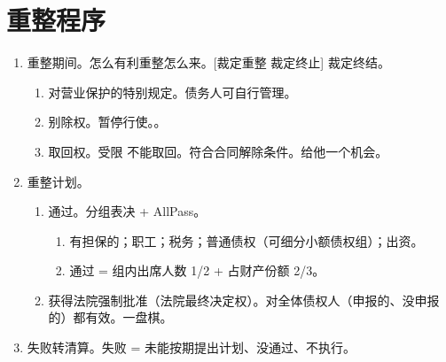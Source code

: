 \section{重整程序}
\begin{enumerate}
  \item 重整期间。怎么有利重整怎么来。[裁定重整 \yjt 裁定终止] \yjt 裁定终结。
        \begin{enumerate}
          \item 对营业保护的特别规定。债务人可自行管理。
          \item 别除权。暂停行使。。
          \item 取回权。受限 \bdy 不能取回。符合合同解除条件。\sjt 给他一个机会。
        \end{enumerate}
  \item 重整计划。
        \begin{enumerate}
          \item 通过。分组表决 + AllPass。
                \begin{enumerate}
                  \item 有担保的；职工；税务；普通债权（可细分小额债权组）；出资。
                  \item 通过 = 组内出席人数 1/2 + 占财产份额 2/3。
                \end{enumerate}
          \item 获得法院强制批准（法院最终决定权）。对全体债权人（申报的、没申报的）都有效。一盘棋。
        \end{enumerate}
  \item 失败转清算。失败 = 未能按期提出计划、没通过、不执行。
\end{enumerate}
